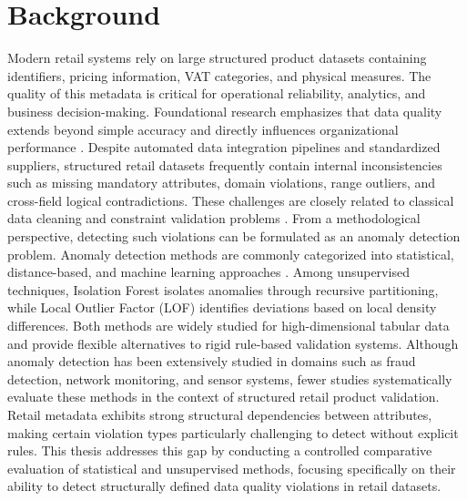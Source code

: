 \documentclass[a4paper, 12pt]{article} %
\begin{document}
\section{Background}
Modern retail systems rely on large structured product datasets containing identifiers, pricing information, VAT categories, and physical measures. The quality of this metadata is critical for operational reliability, analytics, and business decision-making. Foundational research emphasizes that data quality extends beyond simple accuracy and directly influences organizational performance \cite{wang1996beyond, pipino2002data}. Despite automated data integration pipelines and standardized suppliers, structured retail datasets frequently contain internal inconsistencies such as missing mandatory attributes, domain violations, range outliers, and cross-field logical contradictions. These challenges are closely related to classical data cleaning and constraint validation problems \cite{rahm2000data, fan2008dependencies}.
From a methodological perspective, detecting such violations can be formulated as an anomaly detection problem. Anomaly detection methods are commonly categorized into statistical, distance-based, and machine learning approaches \cite{chandola2009anomaly, aggarwal2017outlier, pang2021deep}. Among unsupervised techniques, Isolation Forest \cite{liu2008isolation} isolates anomalies through recursive partitioning, while Local Outlier Factor (LOF) \cite{breunig2000lof} identifies deviations based on local density differences. Both methods are widely studied for high-dimensional tabular data and provide flexible alternatives to rigid rule-based validation systems.
Although anomaly detection has been extensively studied in domains such as fraud detection, network monitoring, and sensor systems, fewer studies systematically evaluate these methods in the context of structured retail product validation. Retail metadata exhibits strong structural dependencies between attributes, making certain violation types particularly challenging to detect without explicit rules. This thesis addresses this gap by conducting a controlled comparative evaluation of statistical and unsupervised methods, focusing specifically on their ability to detect structurally defined data quality violations in retail datasets.
\end{document}

